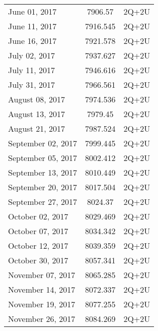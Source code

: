 \documentclass{/Users/art2/TeX/aanda/aa}
\begin{document}
\begin{appendix}
\begin{table} [h]
\begin{tabular}{lcl}
June 01, 2017 & 7906.57 & 2Q+2U \\

June 11, 2017 & 7916.545 & 2Q+2U \\

June 16, 2017 & 7921.578 & 2Q+2U \\

July 02, 2017 & 7937.627 & 2Q+2U \\

July 11, 2017 & 7946.616 & 2Q+2U \\

July 31, 2017 & 7966.561 & 2Q+2U \\

August 08, 2017 & 7974.536 & 2Q+2U \\

August 13, 2017 & 7979.45 & 2Q+2U \\

August 21, 2017 & 7987.524 & 2Q+2U \\

September 02, 2017 & 7999.445 & 2Q+2U \\

September 05, 2017 & 8002.412 & 2Q+2U \\

September 13, 2017 & 8010.449 & 2Q+2U \\

September 20, 2017 & 8017.504 & 2Q+2U \\

September 27, 2017 & 8024.37 & 2Q+2U \\

October 02, 2017 & 8029.469 & 2Q+2U \\

October 07, 2017 & 8034.342 & 2Q+2U \\

October 12, 2017 & 8039.359 & 2Q+2U \\

October 30, 2017 & 8057.341 & 2Q+2U \\

November 07, 2017 & 8065.285 & 2Q+2U \\

November 14, 2017 & 8072.337 & 2Q+2U \\

November 19, 2017 & 8077.255 & 2Q+2U \\

November 26, 2017 & 8084.269 & 2Q+2U \\


\end{tabular}
\end{table}
\end{appendix}
\end{document}
